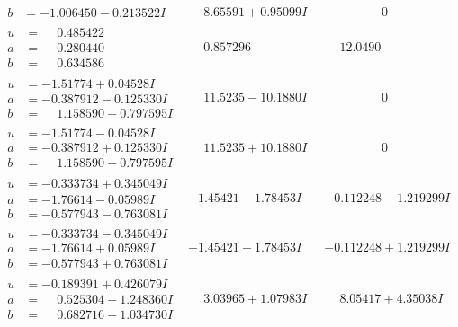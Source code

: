 \documentclass[1p]{elsarticle_modified}
\theoremstyle{definition}
\begin{document}
$$\begin{array}{c|c|c}
\begin{aligned}
b &= -1.006450 - 0.213522 I\end{aligned}
 & \phantom{-}8.65591 + 0.95099 I & \phantom{-0.000000 } 0 \\ \hline\begin{aligned}
u &= \phantom{-}0.485422\phantom{ +0.000000I} \\
a &= \phantom{-}0.280440\phantom{ +0.000000I} \\
b &= \phantom{-}0.634586\phantom{ +0.000000I}\end{aligned}
 & \phantom{-}0.857296\phantom{ +0.000000I} & \phantom{-}12.0490\phantom{ +0.000000I} \\ \hline\begin{aligned}
u &= -1.51774 + 0.04528 I \\
a &= -0.387912 - 0.125330 I \\
b &= \phantom{-}1.158590 - 0.797595 I\end{aligned}
 & \phantom{-}11.5235 - 10.1880 I & \phantom{-0.000000 } 0 \\ \hline\begin{aligned}
u &= -1.51774 - 0.04528 I \\
a &= -0.387912 + 0.125330 I \\
b &= \phantom{-}1.158590 + 0.797595 I\end{aligned}
 & \phantom{-}11.5235 + 10.1880 I & \phantom{-0.000000 } 0 \\ \hline\begin{aligned}
u &= -0.333734 + 0.345049 I \\
a &= -1.76614 - 0.05989 I \\
b &= -0.577943 - 0.763081 I\end{aligned}
 & -1.45421 + 1.78453 I & -0.112248 - 1.219299 I \\ \hline\begin{aligned}
u &= -0.333734 - 0.345049 I \\
a &= -1.76614 + 0.05989 I \\
b &= -0.577943 + 0.763081 I\end{aligned}
 & -1.45421 - 1.78453 I & -0.112248 + 1.219299 I \\ \hline\begin{aligned}
u &= -0.189391 + 0.426079 I \\
a &= \phantom{-}0.525304 + 1.248360 I \\
b &= \phantom{-}0.682716 + 1.034730 I\end{aligned}
 & \phantom{-}3.03965 + 1.07983 I & \phantom{-}8.05417 + 4.35038 I \\ \hline\begin{aligned}

\end{aligned}
\end{array}$$
\end{document}
